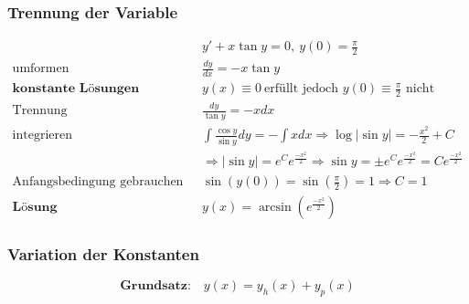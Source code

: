 \subsubsection{Trennung der Variable}

\begin{equation*}
\begin{split}
& y' + x \tan y = 0,\ y(0) = \frac{\pi}{2} \\
\text{umformen}\quad & \frac{dy}{dx} = -x \tan y \\
\textbf{konstante L{\"o}sungen}\quad & y(x) \equiv 0\ \text{erf{\"u}llt jedoch $y(0) \equiv \frac{\pi}{2}$ nicht} \\
\text{Trennung}\quad & \frac{dy}{\tan y} = -x dx \\
\text{integrieren}\quad & \int\frac{\cos y}{\sin y}dy = - \int xdx \Rightarrow \log|\sin y| = -\frac{x^2}{2} + C \\
& \Rightarrow |\sin y| = e^Ce^{\frac{-x^2}{2}} \Rightarrow \sin y = \pm e^Ce^{\frac{-x^2}{2}} = Ce^{\frac{-x^2}{2}} \\
\text{Anfangsbedingung gebrauchen}\quad & \sin(y(0)) = \sin (\frac{\pi}{2}) = 1 \Rightarrow C = 1 \\
\textbf{L{\"o}sung}\quad & y(x) = \arcsin (e^{\frac{-x^2}{2}})
\end{split}
\end{equation*}

\clearpage

\subsubsection{Variation der Konstanten}

\begin{equation*}
\textbf{Grundsatz:}\quad y(x) = y_h(x) + y_p(x)
\end{equation*}

